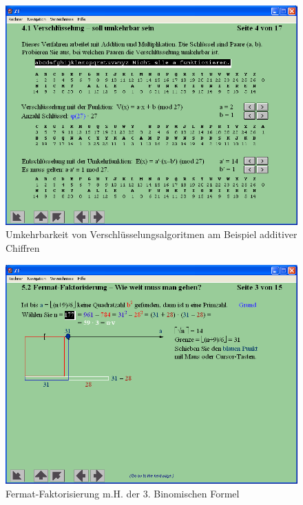 \begin{refsegment}
\begin{figure}[ht]
\begin{center}
\includegraphics[scale=0.4]{figures/NT_Fig_C4-1_ReversibilityAdditiveCipher}
\caption{Umkehrbarkeit von Verschlüsselungsalgoritmen am Beispiel additiver Chiffren}
\label{NT_Fig_C4.1_ReversibilityAdditiveCipher}
\end{center}
\end{figure}


\begin{figure}[ht]
\begin{center}
\includegraphics[scale=0.4]{figures/NT_Fig_C5-2_Fermat-factorization-How-far-1}
\caption{Fermat-Faktorisierung m.H. der 3. Binomischen Formel}
\label{NT_Fig_C5.2_Fermat-factorization-How-far-1}
\end{center}
\end{figure}



\end{refsegment}
